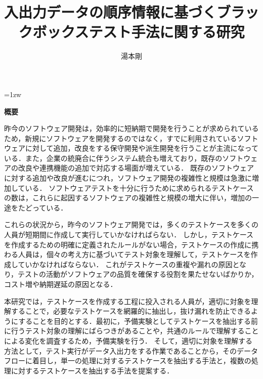 \documentclass[a4paper,12pt]{jreport}
\title{入出力データの順序情報に基づくブラックボックステスト手法に関する研究}
\author{湯本剛}
\begin{document}
\maketitle
\thispagestyle{empty}
\newpage

\thispagestyle{empty}
\vspace*{20pt plus 1fil}
\parindent=1zw
\noindent
\begin{center}
{\bf 概要}
\vspace{5mm}
\end{center}

昨今のソフトウェア開発は，効率的に短納期で開発を行うことが求められているため，新規にソフトウェアを開発するのではなく，すでに利用されているソフトウェアに対して追加，改良をする保守開発や派生開発を行うことが主流になっている．また，企業の統廃合に伴うシステム統合も増えており，既存のソフトウェアの改良や連携機能の追加で対応する場面が増えている．
既存のソフトウェアに対する追加や改良が進むにつれ，ソフトウェア開発の複雑性と規模は急激に増加している．
ソフトウェアテストを十分に行うために求められるテストケースの数は，これらに起因するソフトウェアの複雑性と規模の増大に伴い，増加の一途をたどっている．

これらの状況から，昨今のソフトウェア開発では，多くのテストケースを多くの人員が短期間に作成して実行していかなければらない．
しかし，テストケースを作成するための明確に定義されたルールがない場合，テストケースの作成に携わる人員は，個々の考え方に基づいてテスト対象を理解して，テストケースを作成していかなければならない．
これがテストケースの重複や漏れの原因となり，テストの活動がソフトウェアの品質を確保する役割を果たせないばかりか，コスト増や納期遅延の原因となる．

本研究では，テストケースを作成する工程に投入される人員が，適切に対象を理解することで，必要なテストケースを網羅的に抽出し，抜け漏れを防止できるようにすることを目的とする．最初に，予備実験としてテストケースを抽出する前に行うテスト対象の理解にばらつきがあることや，共通のルールで理解することによる変化を調査するため，予備実験を行う．
そして，適切に対象を理解する方法として，テスト実行がデータ入出力をする作業であることから，そのデータフローに着目し，単一の処理に対するテストケースを抽出する手法と，複数の処理に対するテストケースを抽出する手法を提案する．
\end{document}
